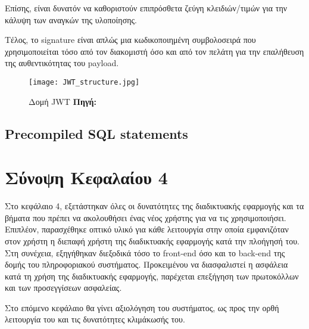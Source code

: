 Επίσης, είναι δυνατόν να καθοριστούν επιπρόσθετα ζεύγη κλειδιών/τιμών για την κάλυψη των αναγκών της υλοποίησης.

Τέλος, το signature είναι απλώς μια κωδικοποιημένη συμβολοσειρά που χρησιμοποιείται τόσο από τον διακομιστή όσο και από τον πελάτη για την επαλήθευση της αυθεντικότητας του payload.

\begin{figure}[h]
	\centering
	\texttt{[image: JWT\_structure.jpg]}
	\caption[{Δομή JWT}]{Δομή JWT \textbf{Πηγή:} \cite{fig_JWT_structure}}
	\label{fig:JWT_structure}
\end{figure}

\subsection{Precompiled SQL statements}

\section{Σύνοψη Κεφαλαίου 4}
Στο κεφάλαιο 4, εξετάστηκαν όλες οι δυνατότητες της διαδικτυακής εφαρμογής και τα βήματα που πρέπει να ακολουθήσει ένας νέος χρήστης για να τις χρησιμοποιήσει. Επιπλέον, παρασχέθηκε οπτικό υλικό για κάθε λειτουργία στην οποία εμφανιζόταν στον χρήστη η διεπαφή χρήστη της διαδικτυακής εφαρμογής κατά την πλοήγησή του. Στη συνέχεια, εξηγήθηκαν διεξοδικά τόσο το front-end όσο και το back-end της δομής του πληροφοριακού συστήματος. Προκειμένου να διασφαλιστεί η ασφάλεια κατά τη χρήση της διαδικτυακής εφαρμογής, παρέχεται επεξήγηση των πρωτοκόλλων και των προσεγγίσεων ασφαλείας.

Στο επόμενο κεφάλαιο θα γίνει αξιολόγηση του συστήματος, ως προς την ορθή λειτουργία του και τις δυνατότητες κλιμάκωσής του.
